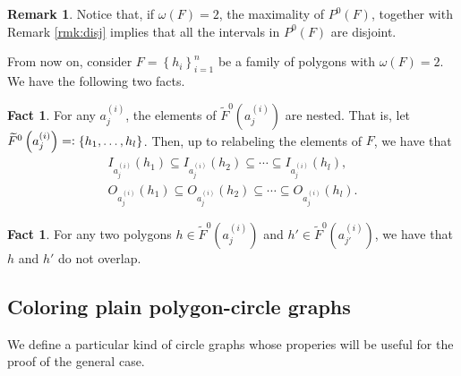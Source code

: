 \documentclass[12pt]{article}
\theoremstyle{definition}
\newtheorem{rmk}[thm]{Remark}
\newtheorem{fact}[thm]{Fact}
\newcommand{\eqdef}{=\vcentcolon}
\begin{document}
     \begin{rmk}
         Notice that, if 
         $\omega\left(F\right) = 2$,
         the maximality of
         $P^{0}\left(F\right)$,
         together with 
         Remark \ref{rmk:disj}
         implies that all the
         intervals in $P^{0}\left(F\right)$
         are disjoint.
     \end{rmk}

     From now on, consider
     $F = \left\{h_{i}\right\}_{i = 1}^{n}$ 
     be a family of polygons
     with $\omega\left(F\right)=2$.
     We have the following two facts.

     \begin{fact} \label{fact:single}
         For any $a_{j}^{\left(i\right)}$,
         the elements of
         $\widetilde{F}^{0}\left(a_{j}^{\left(i\right)}\right)$ 
         are nested. That is, let
             $\widetilde{F}^{0}\left(a_{j}^{\left(i\right)}\right) 
             \eqdef \left\{h_1, \ldots, h_{l}\right\}$.
         Then, up to relabeling
         the elements of $F$, we have that
         \begin{gather*}
             I_{a_{j}^{\left(i\right)}}\left(h_1\right)
             \subseteq I_{a_{j}^{\left(i\right)}}\left(h_2\right)
             \subseteq \cdots
             \subseteq I_{a_{j}^{\left(i\right)}}\left(h_{l}\right), \\
             O_{a_{j}^{\left(i\right)}}\left(h_1\right)
             \subseteq O_{a_{j}^{\left(i\right)}}\left(h_2\right)
             \subseteq \cdots
             \subseteq O_{a_{j}^{\left(i\right)}}\left(h_{l}\right).
         \end{gather*}
     \end{fact}
     
     \begin{fact} \label{fact:double}
         For any two polygons
         $h \in \widetilde{F}^{0}\left(a_{j}^{\left(i\right)}\right)$ 
         and 
         $h' \in \widetilde{F}^{0}\left(a_{j'}^{\left(i\right)}\right)$, 
         we have that $h$ and $h'$
         do not overlap.    
     \end{fact}

     \subsection{Coloring plain polygon-circle graphs}

     We define a particular
     kind of circle graphs
     whose properies
     will be useful for the
     proof of the general case.
\end{document}
